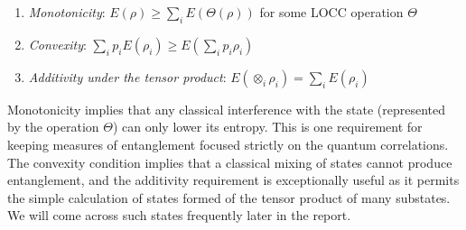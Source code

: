 \begin{enumerate}\label{enum:entanglement}
	\item \textit{Monotonicity}: $E(\rho) \geq \sum_i E(\Theta(\rho))$ for some LOCC operation $\Theta$
	\item \textit{Convexity}: $\sum_{i} p_{i} E\left(\rho_{i}\right) \geq E\left(\sum_{i} p_{i} \rho_{i}\right)$
	\item \textit{Additivity under the tensor product}: $E\left(\otimes_{i} \rho_{i}\right)=\sum_{i} E\left(\rho_{i}\right)$
\end{enumerate} 

Monotonicity implies that any classical interference with the state (represented by the operation $\Theta$) can only lower its entropy. This is one requirement for keeping measures of entanglement focused strictly on the quantum correlations. The convexity condition implies that a classical mixing of states cannot produce entanglement, and the additivity requirement is exceptionally useful as it permits the simple calculation of states formed of the tensor product of many substates. We will come across such states frequently later in the report.





